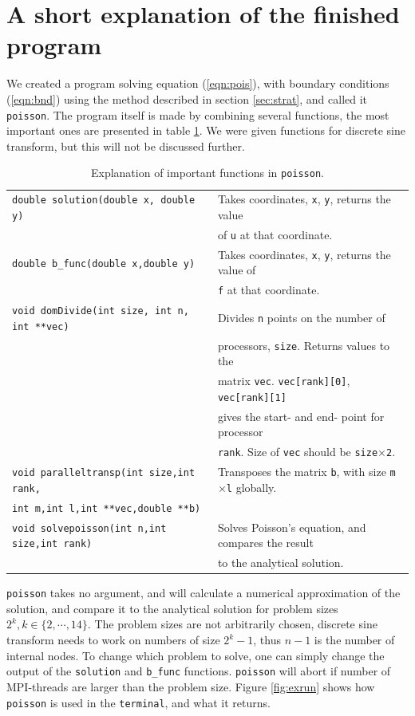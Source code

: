 \documentclass{article}
\begin{document}

\section{A short explanation of the finished program}
We created a program solving equation (\ref{eqn:pois}), with boundary conditions (\ref{eqn:bnd}) using the method described in section \ref{sec:strat}, and called it \texttt{poisson}.
The program itself is made by combining several functions, the most important ones are presented in table \ref{tab:explainfunc}. We were given functions for discrete sine transform, but this will not be discussed further.
\begin{table}[h]
    \begin{tabular}{ll}
    \texttt{double solution(double x, double y)} & Takes coordinates, \texttt{x}, \texttt{y}, returns the  value \\ & of \texttt{u} at that coordinate. \\
    \texttt{double b\_func(double x,double y)} & Takes coordinates, \texttt{x}, \texttt{y}, returns the value of \\ &  \texttt{f} at that coordinate. \\
    \texttt{void domDivide(int size, int n, int **vec)} & Divides \texttt{n} points on the number of\\ &processors, \texttt{size}. Returns values  to the \\&  matrix \texttt{vec}. \texttt{vec[rank][0]},  \texttt{vec[rank][1]} \\ & gives the start- and end- point for processor \\ & \texttt{rank}. Size of \texttt{vec} should be \texttt{size}$\times$\texttt{2}.  \\
    \texttt{void paralleltransp(int size,int rank,}& Transposes the matrix \texttt{b}, with size \texttt{m}$\times$\texttt{l} globally.\\ \texttt{int m,int l,int **vec,double **b)} \\ 
    \texttt{void solvepoisson(int n,int size,int rank)} & Solves Poisson's equation, and compares the result\\& to the analytical solution.
    \end{tabular}
    \caption{Explanation of important functions in \texttt{poisson}.}
    \label{tab:explainfunc}
\end{table}
\texttt{poisson} takes no argument, and will calculate a numerical approximation of the solution, and compare it to the analytical solution for problem sizes $2^k, k \in \{2, \cdots ,14\}$. The problem sizes are not arbitrarily chosen, discrete sine transform needs to work on numbers of size $2^k-1$, thus $n-1$ is the number of internal nodes. To change which problem to solve, one can simply change the output of the \texttt{solution} and \texttt{b\_func} functions. \texttt{poisson} will abort if number of MPI-threads are larger than the problem size.
Figure \ref{fig:exrun} shows how \texttt{poisson} is used in the \texttt{terminal}, and what it returns.
\end{document}
